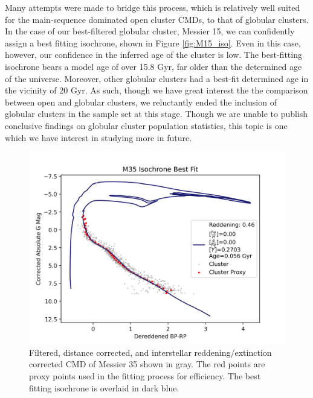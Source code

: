 \documentclass[onecolumn,table,xcdraw,super]{aastex631}
\begin{document}
Many attempts were made to bridge this process, which is relatively well suited for the main-sequence dominated open cluster CMDs, to that of globular clusters. In the case of our best-filtered globular cluster, Messier 15, we can confidently assign a best fitting isochrone, shown in Figure \ref{fig:M15_iso}. Even in this case, however, our confidence in the inferred age of the cluster is low. The best-fitting isochrone bears a model age of over 15.8 Gyr, far older than the determined age of the universe. Moreover, other globular clusters had a best-fit determined age in the vicinity of 20 Gyr. As such, though we have great interest the the comparison between open and globular clusters, we reluctantly ended the inclusion of globular clusters in the sample set at this stage. Though we are unable to publish conclusive findings on globular cluster population statistics, this topic is one which we have interest in studying more in future.

\begin{figure}[]
    \centering
      \includegraphics[width=4.75in]{figures/M35_CMD_Iso_BestFit.png}
    \caption{Filtered, distance corrected, and interstellar reddening/extinction corrected CMD of Messier 35 shown in gray. The red points are proxy points used in the fitting process for efficiency. The best fitting isochrone is overlaid in dark blue.}
    \label{fig:M35_iso}
\end{figure}
\end{document}
